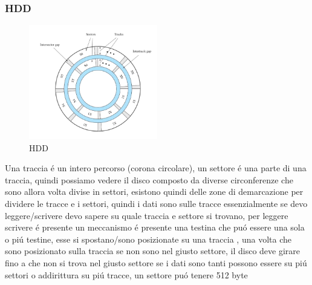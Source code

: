 \subsubsection*{HDD}
\begin{figure}[H]
    \centering
    \includegraphics[width=0.5\textwidth]{immagini/schemahdd}
    \caption{HDD}
\end{figure}
Una traccia é un intero percorso (corona circolare), un settore é una parte di una traccia, quindi possiamo
vedere il disco composto da diverse circonferenze che sono allora volta divise in settori, esistono quindi delle
zone di demarcazione per dividere le tracce e i settori, quindi i dati sono sulle tracce essenzialmente
se devo leggere/scrivere devo sapere su quale traccia e settore si trovano, per leggere scrivere é presente un meccanismo
é presente una testina che puó essere una sola o piú testine, esse si spostano/sono posizionate su una traccia , una volta
che sono posizionato sulla traccia se non sono nel giusto settore, il disco deve girare fino a che non si trova nel giusto settore
se i dati sono tanti possono essere su piú settori o addirittura su piú tracce, un settore puó tenere 512 byte
